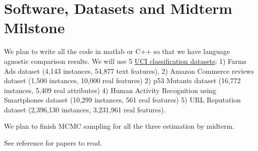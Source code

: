 \documentclass[a4paper, 10pt]{article}
\begin{document}
\section {Software, Datasets and Midterm Milstone}
\vspace{-5pt}
We plan to write all the code in matlab or C++ so that we have language agnostic comparison results. We will use 5 \href{http://archive.ics.uci.edu/ml/datasets.html}{UCI classification datasets}: 1) Farms Ads dataset (4,143 instances, 54,877 text features), 2) Amazon Commerce reviews dataset (1,500 instances, 10,000 real features) 2) p53 Mutants dataset (16,772 instances, 5,409 real attributes) 4) Human Activity Recognition using Smartphones dataset (10,299 instances, 561 real features) 5) URL Reputation dataset (2,396,130 instances, 3,231,961 real features).

We plan to finish MCMC sampling for all the three estimation by midterm.

See reference for papers to read.


\end{document}
